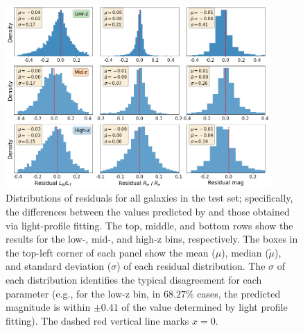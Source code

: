 \begin{figure}[htb]
    \centering
    \includegraphics[width = 0.9\textwidth]{resi_all_z.png}
    \caption{Distributions of residuals for all galaxies in the test set; specifically, the differences between the values predicted by \gampen{} and those obtained via light-profile fitting. The top, middle, and bottom rows show the results for the low-, mid-, and high-z bins, respectively. The boxes in the top-left corner of each panel show the mean ($\mu$), median ($\tilde{\mu}$), and standard deviation ($\sigma$) of each residual distribution. The $\sigma$ of each distribution identifies the typical disagreement for each parameter (e.g., for the low-z bin, in $68.27\%$ cases, the predicted magnitude is within $\pm0.41$ of the value determined by light profile fitting). The dashed red vertical line marks  $x=0$.}
    \label{fig_c3:resi_all_z}
\end{figure}

